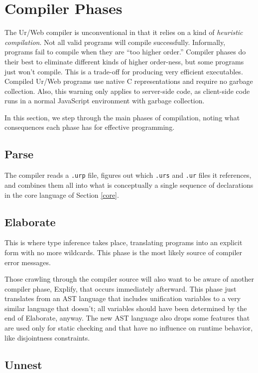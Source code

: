\documentclass{article}
\begin{document}
\section{\label{phases}Compiler Phases}

The Ur/Web compiler is unconventional in that it relies on a kind of \emph{heuristic compilation}.  Not all valid programs will compile successfully.  Informally, programs fail to compile when they are ``too higher order.''  Compiler phases do their best to eliminate different kinds of higher order-ness, but some programs just won't compile.  This is a trade-off for producing very efficient executables.  Compiled Ur/Web programs use native C representations and require no garbage collection.  Also, this warning only applies to server-side code, as client-side code runs in a normal JavaScript environment with garbage collection.

In this section, we step through the main phases of compilation, noting what consequences each phase has for effective programming.

\subsection{Parse}

The compiler reads a \texttt{.urp} file, figures out which \texttt{.urs} and \texttt{.ur} files it references, and combines them all into what is conceptually a single sequence of declarations in the core language of Section \ref{core}.

\subsection{Elaborate}

This is where type inference takes place, translating programs into an explicit form with no more wildcards.  This phase is the most likely source of compiler error messages.

Those crawling through the compiler source will also want to be aware of another compiler phase, Explify, that occurs immediately afterward.  This phase just translates from an AST language that includes unification variables to a very similar language that doesn't; all variables should have been determined by the end of Elaborate, anyway.  The new AST language also drops some features that are used only for static checking and that have no influence on runtime behavior, like disjointness constraints.

\subsection{Unnest}
\end{document}
